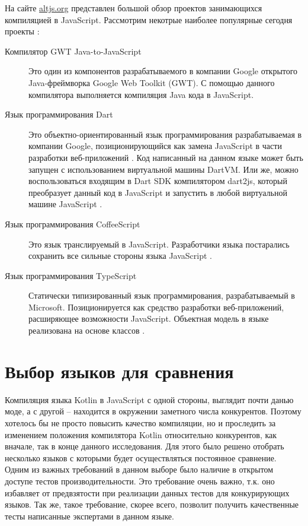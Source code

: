 На сайте \url{altjs.org} представлен большой обзор проектов занимающихся компиляцией в JavaScript. Рассмотрим некотрые наиболее популярные сегодня проекты \cite{langpop}:
\begin{description}
\item[Компилятор GWT Java-to-JavaScript]
Это один из компонентов разрабатываемого в компании Google открытого Java-фреймворка Google Web Toolkit (GWT). С помощью данного компилятора выполняется компиляция Java кода в JavaScript.

\item[Язык программирования Dart]
Это объектно-ориентированный язык программирования разрабатываемая в компании Google, позиционирующийся как замена JavaScript в части разработки веб-приложений \cite{wiki:Dart:en}. %
Код написанный на данном языке может быть запущен с использованием виртуальной машины DartVM. Или же, можно воспользоваться входящим в Dart SDK компилятором dart2js, который преобразует данный код в JavaScript и запустить в любой виртуальной машине JavaScript \cite{Dart}.

\item[Язык программирования CoffeeScript]
Это язык транслируемый в JavaScript. Разработчики языка постарались сохранить все сильные стороны языка JavaScript \cite{CoffeeScript}.

\item[Язык программирования TypeScript]
Статически типизированный язык программирования, разрабатываемый в Microsoft. Позиционируется как средство разработки веб-приложений, расширяющее возможности JavaScript. Объектная модель в языке реализована на основе классов \cite{wiki:TypeScript, TypeScript}.

\end{description}


\section{Выбор языков для сравнения}

Компиляция языка Kotlin в JavaScript с одной стороны, выглядит почти данью моде, а с другой -- находится в окружении заметного числа конкурентов. Поэтому хотелось бы не просто повысить качество компиляции, но и проследить за изменением положения компилятора Kotlin относительно конкурентов, как вначале, так в конце данного исследования. Для этого было решено отобрать несколько языков с которыми будет осуществляться постоянное сравнение. Одним из важных требований в данном выборе было наличие в открытом доступе тестов производительности. Это требование очень важно, т.к. оно избавляет от предвзятости при реализации данных тестов для конкурирующих языков. Так же, такое требование, скорее всего, позволит получить качественные тесты написанные экспертами в данном языке. 

